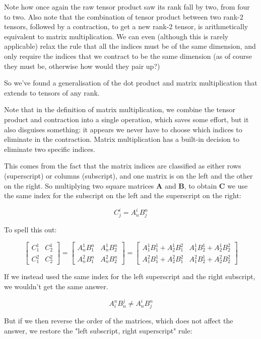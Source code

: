 Note how once again the raw tensor product saw its rank fall by two, from four to two. Also note that the combination of tensor product between two rank-2 tensors, followed by a contraction, to get a new rank-2 tensor, is arithmetically equivalent to matrix multiplication. We can even (although this is rarely applicable) relax the rule that all the indices must be of the same dimension, and only require the indices that we contract to be the same dimension (as of course they must be, otherwise how would they pair up?)

So we've found a generalisation of the dot product and matrix multiplication that extends to tensors of any rank.

Note that in the definition of matrix multiplication, we combine the tensor product and contraction into a single operation, which saves some effort, but it also disguises something: it appears we never have to choose which indices to eliminate in the contraction. Matrix multiplication has a built-in decision to eliminate two specific indices.

This comes from the fact that the matrix indices are classified as either rows (superscript) or columns (subscript), and one matrix is on the left and the other on the right. So multiplying two square matrices $\boldsymbol{A}$ and $\boldsymbol{B}$, to obtain $\boldsymbol{C}$ we use the same index for the subscript on the left and the superscript on the right:

$$C^i_j = A^i_nB^n_j$$

To spell this out:

$$
\begin{bmatrix}C^1_1 & C^1_2 \\ C^2_1 & C^2_2\end{bmatrix}
= \begin{bmatrix}A^1_nB^n_1 & A^1_nB^n_2 \\ A^2_nB^n_1 & A^2_nB^n_2\end{bmatrix}
= \begin{bmatrix}A^1_1B^1_1 + A^1_2B^2_1 & A^1_1B^1_2 + A^1_2B^2_2 \\ A^2_1B^1_1 + A^2_2B^2_1 & A^2_1B^1_2 + A^2_2B^2_2\end{bmatrix}
$$

If we instead used the same index for the left superscript and the right subscript, we wouldn't get the same answer.

$$A^n_iB^j_n \ne A^i_nB^n_j$$

But if we then reverse the order of the matrices, which does not affect the answer, we restore the "left subscript, right superscript" rule:

